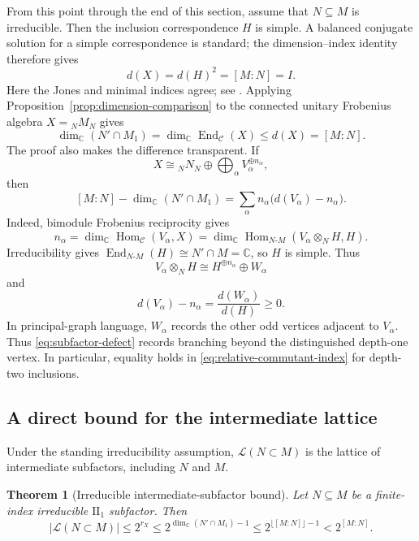 \documentclass[11pt]{amsart}
\newtheorem{theorem}{Theorem}[section]
\theoremstyle{definition}
\theoremstyle{remark}
\newcommand{\C}{\mathcal C}
\newcommand{\CC}{\mathbb C}
\DeclareMathOperator{\Hom}{Hom}
\DeclareMathOperator{\End}{End}
\begin{document}
From this point through the end of this section, assume that
$N\subseteq M$ is irreducible.  Then the inclusion correspondence $H$
is simple.  A balanced conjugate solution for a simple correspondence
is standard; the dimension--index identity therefore gives
\begin{equation}\label{eq:unitary-frobenius-index}
 d(X)=d(H)^2=[M:N]=I.
\end{equation}
Here the Jones and minimal indices agree; see \cite[\S2.2]{BKLR}.
Applying Proposition~\ref{prop:dimension-comparison} to the connected
unitary Frobenius algebra $X={}_NM_N$ gives
\begin{equation}\label{eq:relative-commutant-index}
 \dim_{\CC}(N'\cap M_1)
 =\dim_{\CC}\End_{\C}(X)
 \leq d(X)=[M:N].
\end{equation}
The proof also makes the difference transparent.  If
\begin{equation}\label{eq:canonical-decomposition}
 X\cong{}_NN_N\oplus\bigoplus_{\alpha}V_\alpha^{\oplus n_\alpha},
\end{equation}
then
\begin{equation}\label{eq:subfactor-defect}
 [M:N]-\dim_{\CC}(N'\cap M_1)
 =\sum_\alpha n_\alpha\bigl(d(V_\alpha)-n_\alpha\bigr).
\end{equation}
Indeed, bimodule Frobenius reciprocity gives
\[
 n_\alpha
 =\dim_{\CC}\Hom_{\C}(V_\alpha,X)
 =\dim_{\CC}\Hom_{N\text{-}M}(V_\alpha\otimes_N H,H).
\]
Irreducibility gives
$\End_{N\text{-}M}(H)\cong N'\cap M=\CC$, so $H$ is simple.  Thus
\[
 V_\alpha\otimes_N H\cong H^{\oplus n_\alpha}\oplus W_\alpha
\]
and
\begin{equation}\label{eq:depth-three-defect}
 d(V_\alpha)-n_\alpha
 =\frac{d(W_\alpha)}{d(H)}\geq0.
\end{equation}
In principal-graph language, $W_\alpha$ records the other odd vertices
adjacent to $V_\alpha$.  Thus \eqref{eq:subfactor-defect} records branching
beyond the distinguished depth-one vertex.  In particular, equality holds in
\eqref{eq:relative-commutant-index} for depth-two inclusions.

\subsection{A direct bound for the intermediate lattice}

Under the standing irreducibility assumption, $\mathcal L(N\subset M)$
is the lattice of intermediate subfactors, including $N$ and $M$.

\begin{theorem}[Irreducible intermediate-subfactor bound]
\label{thm:subfactor-bound}
Let $N\subseteq M$ be a finite-index irreducible $\mathrm{II}_1$
subfactor.  Then
\begin{equation}\label{eq:subfactor-bound-chain}
 |\mathcal L(N\subset M)|
 \leq2^{r_X}\leq2^{\dim_{\CC}(N'\cap M_1)-1}
 \leq2^{\lfloor[M:N]\rfloor-1}<2^{[M:N]}.
\end{equation}
\end{theorem}
\end{document}
